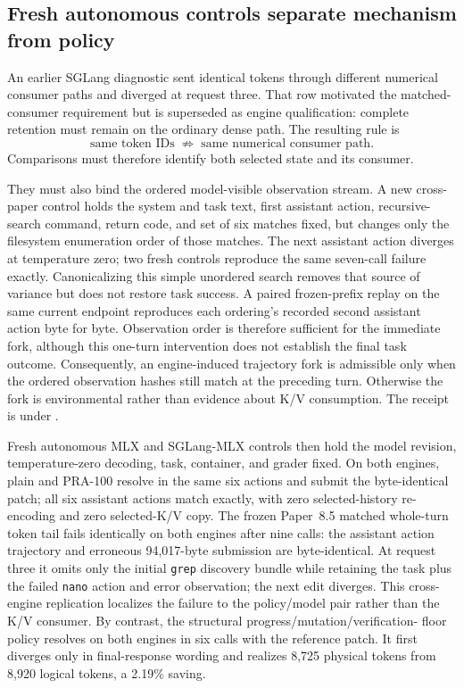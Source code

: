 \documentclass[11pt]{article}
\begin{document}
\subsection{Fresh autonomous controls separate mechanism from policy}

An earlier SGLang diagnostic sent identical tokens through different numerical
consumer paths and diverged at request three.  That row motivated the matched-
consumer requirement but is superseded as engine qualification: complete
retention must remain on the ordinary dense path.  The resulting rule is
\[
\boxed{\text{same token IDs}\;\not\Rightarrow\;
\text{same numerical consumer path}.}
\]
Comparisons must therefore identify both selected state and its consumer.

They must also bind the ordered model-visible observation stream.  A new
cross-paper control holds the system and task text, first assistant action,
recursive-search command, return code, and set of six matches fixed, but
changes only the filesystem enumeration order of those matches.  The next
assistant action diverges at temperature zero; two fresh controls reproduce
the same seven-call failure exactly.  Canonicalizing this simple unordered
search removes that source of variance but does not restore task success.  A
paired frozen-prefix replay on the same current endpoint reproduces each
ordering's recorded second assistant action byte for byte.  Observation order
is therefore sufficient for the immediate fork, although this one-turn
intervention does not establish the final task outcome.
Consequently, an engine-induced trajectory fork is admissible only when the
ordered observation hashes still match at the preceding turn.  Otherwise the
fork is environmental rather than evidence about K/V consumption.  The
receipt is under
.

Fresh autonomous MLX and SGLang-MLX controls then hold the model revision,
temperature-zero decoding, task, container, and grader fixed.  On both engines,
plain and PRA-100 resolve in the same six actions and submit the byte-identical
patch; all six assistant actions match exactly, with zero selected-history
re-encoding and zero selected-K/V copy.  The frozen Paper~8.5 matched whole-turn
token tail fails identically on both engines after nine calls: the assistant
action trajectory and erroneous 94,017-byte submission are byte-identical.
At request three it omits only the initial \texttt{grep} discovery bundle while
retaining the task plus the failed \texttt{nano} action and error observation;
the next edit diverges.  This cross-engine replication localizes the failure to
the policy/model pair rather than the K/V consumer.  By contrast, the
structural progress/mutation/verification-
floor policy resolves on both engines in six calls with the reference patch.
It first diverges only in final-response wording and realizes 8,725 physical
tokens from 8,920 logical tokens, a 2.19\% saving.
\end{document}
